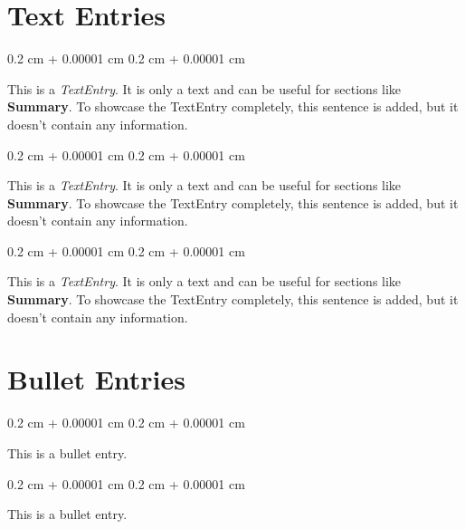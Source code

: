 \documentclass[10pt, letterpaper]{article}
\newenvironment{onecolentry}{
    \begin{adjustwidth}{
        0.2 cm + 0.00001 cm
    }{
        0.2 cm + 0.00001 cm
    }
}{
    \end{adjustwidth}
} %
\begin{document}
    \section{Text Entries}

        
        \begin{onecolentry}
            This is a \textit{TextEntry}. It is only a text and can be useful for sections like \textbf{Summary}. To showcase the TextEntry completely, this sentence is added, but it doesn't contain any information.
        \end{onecolentry}

        \vspace{0.2 cm}

        \begin{onecolentry}
            This is a \textit{TextEntry}. It is only a text and can be useful for sections like \textbf{Summary}. To showcase the TextEntry completely, this sentence is added, but it doesn't contain any information.
        \end{onecolentry}

        \vspace{0.2 cm}

        \begin{onecolentry}
            This is a \textit{TextEntry}. It is only a text and can be useful for sections like \textbf{Summary}. To showcase the TextEntry completely, this sentence is added, but it doesn't contain any information.
        \end{onecolentry}


    
    \section{Bullet Entries}

        
        \begin{onecolentry}
            \textbullet \hspace{3pt} This is a bullet entry.
        \end{onecolentry}

        \vspace{0.2 cm}

        \begin{onecolentry}
            \textbullet \hspace{3pt} This is a bullet entry.
        \end{onecolentry}
\end{document}
